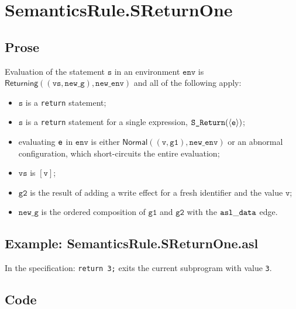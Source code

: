 \documentclass{book}
\newcommand\ProseOrAbnormal[0]{or an abnormal configuration, which short-circuits the entire evaluation}
\newcommand\Normal[0]{\textsf{Normal}}
\newcommand\Returning[0]{\textsf{Returning}}
\newcommand\newenv[0]{\texttt{new\_env}}
\newcommand\env[0]{\texttt{env}}
\newcommand\newg[0]{\texttt{new\_g}}
\newcommand\vv[0]{\texttt{v}}
\newcommand\vs[0]{\texttt{s}}
\newcommand\vvs[0]{\texttt{vs}}
\newcommand\vgone[0]{\texttt{g1}}
\newcommand\vgtwo[0]{\texttt{g2}}
\begin{document}

\section{SemanticsRule.SReturnOne \label{sec:SemanticsRule.SReturnOne}}
    \subsection{Prose}
    Evaluation of the statement $\vs$ in an environment $\env$ is \\
    $\Returning((\vvs, \newg), \newenv)$ and all of the following apply:
    \begin{itemize}
    \item $\vs$ is a \texttt{return} statement;
    \item $\vs$ is a \texttt{return} statement for a single expression, $\texttt{S\_Return}(\langle\texttt{e}\rangle)$;
    \item evaluating $\texttt{e}$ in $\env$ is either $\Normal((\vv, \vgone), \newenv)$ \ProseOrAbnormal;
    \item $\vvs$ is $[\vv]$;
    \item $\vgtwo$ is the result of adding a write effect for a fresh identifier and the value $\vv$;
    \item $\newg$ is the ordered composition of $\vgone$ and $\vgtwo$ with the $\mathtt{asl\_data}$ edge.
    \end{itemize}

    \subsection{Example: SemanticsRule.SReturnOne.asl}
    In the specification:
    \texttt{return 3;} exits the current subprogram with value \texttt{3}.

  \subsection{Code}
\end{document}
